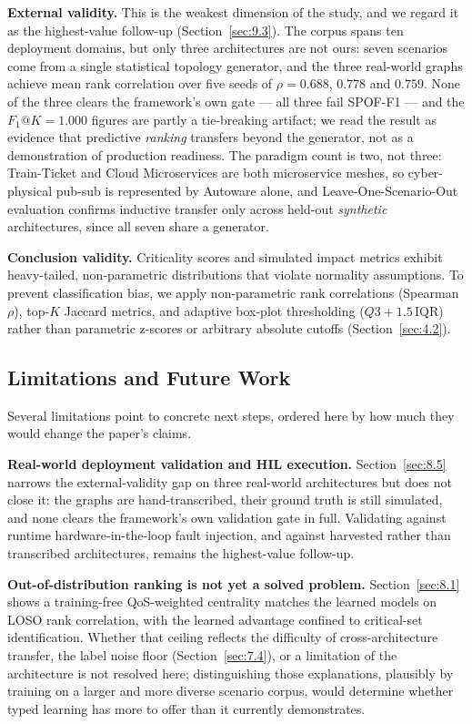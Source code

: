 \textbf{External validity.} This is the weakest dimension of the study, and we regard it as the
highest-value follow-up (Section~\ref{sec:9.3}). The corpus spans ten deployment domains, but only
three architectures are not ours: seven scenarios come from a single statistical topology generator,
and the three real-world graphs achieve mean rank correlation over five seeds of \(\rho=0.688\),
\(0.778\) and \(0.759\). None of the three clears the framework's own gate --- all three fail SPOF-F1
--- and the \(F_1@K=1.000\) figures are partly a tie-breaking artifact; we read the result as evidence
that predictive \emph{ranking} transfers beyond the generator, not as a demonstration of production
readiness. The paradigm count is two, not three: Train-Ticket and Cloud Microservices are both
microservice meshes, so cyber-physical pub-sub is represented by Autoware alone, and
Leave-One-Scenario-Out evaluation confirms inductive transfer only across held-out \emph{synthetic}
architectures, since all seven share a generator.

\textbf{Conclusion validity.} Criticality scores and simulated impact metrics exhibit heavy-tailed,
non-parametric distributions that violate normality assumptions. To prevent classification bias, we
apply non-parametric rank correlations (Spearman \(\rho\)), top-\(K\) Jaccard metrics, and adaptive
box-plot thresholding (\(Q3+1.5\,\mathrm{IQR}\)) rather than parametric z-scores or arbitrary
absolute cutoffs (Section~\ref{sec:4.2}).

\hypertarget{limitations-and-future-work}{%
\subsection{Limitations and Future Work}\label{limitations-and-future-work}}

\label{sec:9.3}

Several limitations point to concrete next steps, ordered here by how much they would change the
paper's claims.

\textbf{Real-world deployment validation and HIL execution.} Section~\ref{sec:8.5} narrows the
external-validity gap on three real-world architectures but does not close it: the graphs are
hand-transcribed, their ground truth is still simulated, and none clears the framework's own
validation gate in full. Validating against runtime hardware-in-the-loop fault injection, and against
harvested rather than transcribed architectures, remains the highest-value follow-up.

\textbf{Out-of-distribution ranking is not yet a solved problem.} Section~\ref{sec:8.1} shows a
training-free QoS-weighted centrality matches the learned models on LOSO rank correlation, with the
learned advantage confined to critical-set identification. Whether that ceiling reflects the
difficulty of cross-architecture transfer, the label noise floor (Section~\ref{sec:7.4}), or a
limitation of the architecture is not resolved here; distinguishing those explanations, plausibly by
training on a larger and more diverse scenario corpus, would determine whether typed learning has
more to offer than it currently demonstrates.

